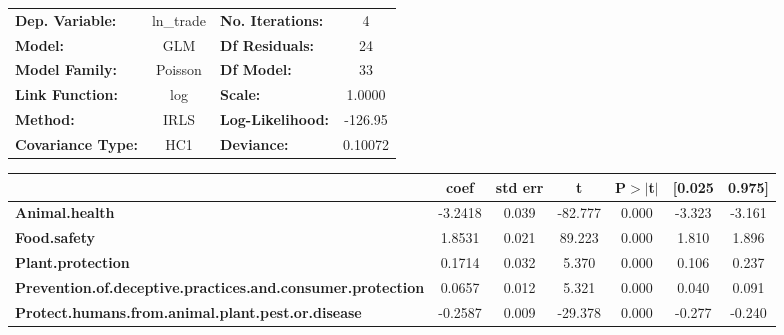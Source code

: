 \begin{center}
\begin{tabular}{lclc}
\toprule
\textbf{Dep. Variable:}                                            &   ln\_trade   & \textbf{  No. Iterations:    } &     4       \\
\textbf{Model:}                                                    &      GLM      & \textbf{  Df Residuals:      } &     24      \\
\textbf{Model Family:}                                             &    Poisson    & \textbf{  Df Model:          } &     33      \\
\textbf{Link Function:}                                            &      log      & \textbf{  Scale:             } &    1.0000   \\
\textbf{Method:}                                                   &      IRLS     & \textbf{  Log-Likelihood:    } &   -126.95   \\
\textbf{Covariance Type:}                                          &      HC1      & \textbf{  Deviance:          } &   0.10072   \\
\bottomrule
\end{tabular}
\begin{tabular}{lcccccc}
                                                                   & \textbf{coef} & \textbf{std err} & \textbf{t} & \textbf{P$> |$t$|$} & \textbf{[0.025} & \textbf{0.975]}  \\
\midrule
\textbf{Animal.health}                                             &      -3.2418  &        0.039     &   -82.777  &         0.000        &       -3.323    &       -3.161     \\
\textbf{Food.safety}                                               &       1.8531  &        0.021     &    89.223  &         0.000        &        1.810    &        1.896     \\
\textbf{Plant.protection}                                          &       0.1714  &        0.032     &     5.370  &         0.000        &        0.106    &        0.237     \\
\textbf{Prevention.of.deceptive.practices.and.consumer.protection} &       0.0657  &        0.012     &     5.321  &         0.000        &        0.040    &        0.091     \\
\textbf{Protect.humans.from.animal.plant.pest.or.disease}          &      -0.2587  &        0.009     &   -29.378  &         0.000        &       -0.277    &       -0.240     \\

\end{tabular}
\end{center}
